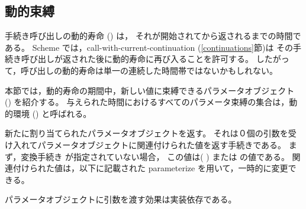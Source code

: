 \subsection{動的束縛}\unsection

手続き呼び出しの動的寿命 () は，
それが開始されてから返されるまでの時間である。
Scheme では，{\cf call-with-current-continuation} (\ref{continuations}節)は
その手続き呼び出しが返された後に動的寿命に再び入ることを許可する。
したがって，呼び出しの動的寿命は単一の連続した時間帯ではないかもしれない。

本節では，動的寿命の期間中，新しい値に束縛できるパラメータオブジェクト () を紹介する。
与えられた時間におけるすべてのパラメータ束縛の集合は，動的環境 () と呼ばれる。

\begin{entry}{%
}

新たに割り当てられたパラメータオブジェクトを返す。
それは０個の引数を受け入れてパラメータオブジェクトに関連付けられた値を返す手続きである。
まず，変換手続き  が指定されていない場合，
この値は{\cf ( )} または の値である。
関連付けられた値は，以下に記載された {\cf parameterize} を用いて，一時的に変更できる。

パラメータオブジェクトに引数を渡す効果は実装依存である。
\end{entry}

